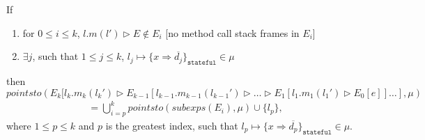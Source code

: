 \documentclass{llncs}
\newcommand{\keywadj}[1]{\mathtt{#1}}
\newcommand{\intuition}[1]{#1}
\begin{document}
\begin{mdframed}
\begin{lemma}
\label{l:pt-has-stateful}
If
\begin{enumerate}
\item for $0 \leq i \leq k$, $l.m(l') \rhd E \not\in E_i$ \intuition{\hspace{150pt} [no method call stack frames in $E_i$]}
\item $\exists j$, such that $1 \leq j \leq k$, $l_j \mapsto \{ x \Rightarrow \overline{d_j} \}_{\keywadj{stateful}} \in \mu$
\intuition{}
\end{enumerate}
then
\noindent$pointsto(E_k[l_k.m_k(l_k') \rhd E_{k-1}[l_{k-1}.m_{k-1}(l_{k-1}') \rhd \dots \rhd E_1[l_1.m_1(l_1') \rhd E_0[e]] \dots ], \mu)$
\vspace{-7pt}
\begin{align*}
&= \bigcup^k_{i = p} pointsto(subexps(E_i), \mu) \cup \{ l_p\},
\end{align*}
where $1 \leq p \leq k$ and $p$ is the greatest index, such that $l_p \mapsto \{ x \Rightarrow \overline{d_p} \}_{\keywadj{stateful}} \in \mu$.

\intuition{}
\end{lemma}
\end{mdframed}
\end{document}
